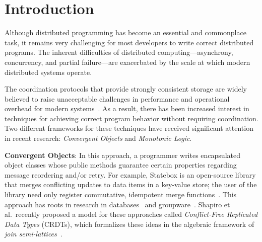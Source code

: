 \section{Introduction} 
\label{sec:intro} 
Although distributed programming has become an essential and commonplace task,
it remains very challenging for most developers to write correct distributed
programs. The inherent difficulties of distributed computing---asynchrony,
concurrency, and partial failure---are exacerbated by the scale at which modern
distributed systems operate.

The coordination protocols that provide strongly consistent storage are widely believed to raise unacceptable challenges in performance and operational overhead for modern systems~\cite{Birman2009}. As a result, 
there has been increased interest in techniques for achieving correct program behavior without requiring coordination. 
Two different frameworks for these techniques have received significant attention in recent research:
\emph{Convergent Objects} and \emph{Monotonic Logic}.  

\vspace{0.5em}\noindent
\textbf{Convergent Objects}: In this approach, a programmer writes encapsulated
object classes whose public methods guarantee certain properties regarding
message reordering and/or retry. For example, Statebox is an open-source library
that merges conflicting updates to data items in a key-value store; the user of
the library need only register commutative, idempotent merge
functions~\cite{statebox}. This approach has roots in research in
databases~\cite{Farrag1989,Garcia-Molina1983,Helland2009} and
groupware~\cite{Ellis1989,Sun1998}.  Shapiro et al.\ recently proposed a model
for these approaches called \emph{Conflict-Free Replicated Data Types} (CRDTs),
which formalizes these ideas in the algebraic framework of {\em join semi-lattices}~\cite{Shapiro2011b}.

